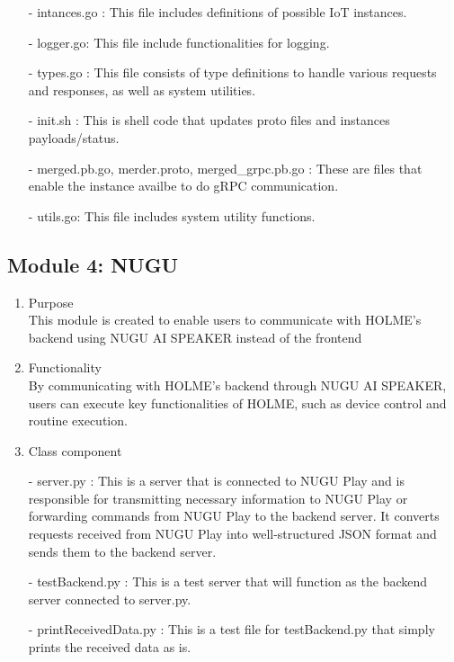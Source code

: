 \documentclass[conference]{IEEEtran}
\begin{document}
\begin{enumerate}
        \item[-] intances.go : This file includes definitions of possible IoT instances.\\
        \item[-] logger.go: This file include functionalities for logging.\\
        \item[-] types.go : This file consists of type definitions to handle various requests and responses, as well as system utilities.
\\
        \item[-] init.sh : This is shell code that updates proto files and instances payloads/status.
 \\
        \item[-] merged.pb.go, merder.proto, merged\_grpc.pb.go  : These are files that enable the instance availbe to do gRPC communication.\\
        \item[-] utils.go: This file includes system utility functions.\\
\end{enumerate}
\clearpage

\subsection{Module 4: NUGU}
\begin{enumerate}
    \item Purpose\\
    This module is created to enable users to communicate with HOLME's backend using NUGU AI SPEAKER instead of the frontend\\
    \item Functionality\\
    By communicating with HOLME's backend through NUGU AI SPEAKER, users can execute key functionalities of HOLME, such as device control and routine execution. \\
    \item Class component
        \item[-] server.py : This is a server that is connected to NUGU Play and is responsible for transmitting necessary information to NUGU Play or forwarding commands from NUGU Play to the backend server. It converts requests received from NUGU Play into well-structured JSON format and sends them to the backend server.\\
        \item[-] testBackend.py : This is a test server that will function as the backend server connected to server.py.\\
        \item[-] printReceivedData.py : This is a test file for testBackend.py that simply prints the received data as is.\\\\
\end{enumerate}
\end{document}
